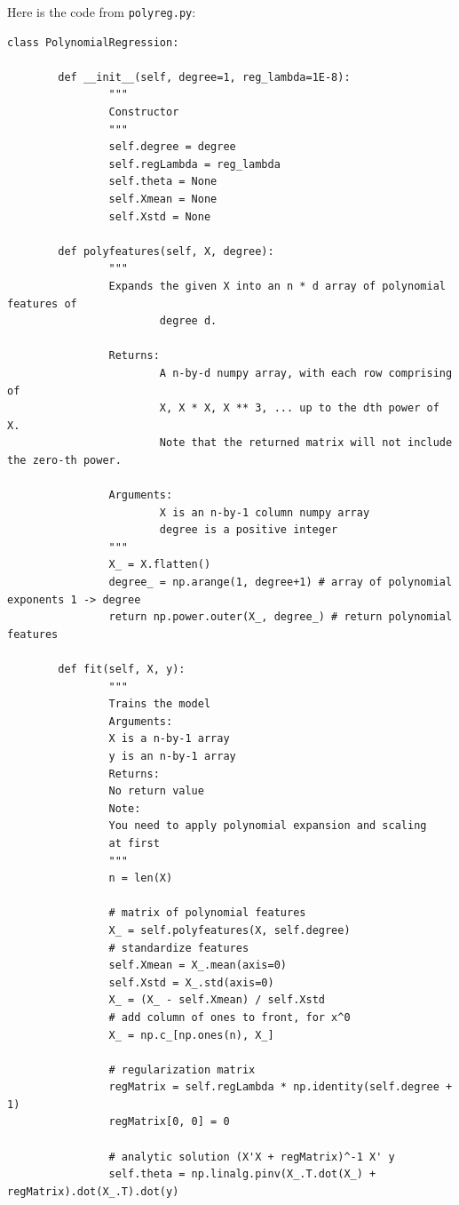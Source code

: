 \documentclass{article}
\begin{document}
Here is the code from \texttt{polyreg.py}:
\begin{verbatim}
class PolynomialRegression:

        def __init__(self, degree=1, reg_lambda=1E-8):
                """
                Constructor
                """
                self.degree = degree
                self.regLambda = reg_lambda
                self.theta = None
                self.Xmean = None
                self.Xstd = None

        def polyfeatures(self, X, degree):
                """
                Expands the given X into an n * d array of polynomial features of
                        degree d.

                Returns:
                        A n-by-d numpy array, with each row comprising of
                        X, X * X, X ** 3, ... up to the dth power of X.
                        Note that the returned matrix will not include the zero-th power.

                Arguments:
                        X is an n-by-1 column numpy array
                        degree is a positive integer
                """
                X_ = X.flatten()
                degree_ = np.arange(1, degree+1) # array of polynomial exponents 1 -> degree
                return np.power.outer(X_, degree_) # return polynomial features

        def fit(self, X, y):
                """
                Trains the model
                Arguments:
                X is a n-by-1 array
                y is an n-by-1 array
                Returns:
                No return value
                Note:
                You need to apply polynomial expansion and scaling
                at first
                """
                n = len(X)
                
                # matrix of polynomial features
                X_ = self.polyfeatures(X, self.degree)
                # standardize features
                self.Xmean = X_.mean(axis=0)
                self.Xstd = X_.std(axis=0)
                X_ = (X_ - self.Xmean) / self.Xstd
                # add column of ones to front, for x^0
                X_ = np.c_[np.ones(n), X_]

                # regularization matrix
                regMatrix = self.regLambda * np.identity(self.degree + 1)
                regMatrix[0, 0] = 0

                # analytic solution (X'X + regMatrix)^-1 X' y
                self.theta = np.linalg.pinv(X_.T.dot(X_) + regMatrix).dot(X_.T).dot(y)


\end{verbatim}
\end{document}
